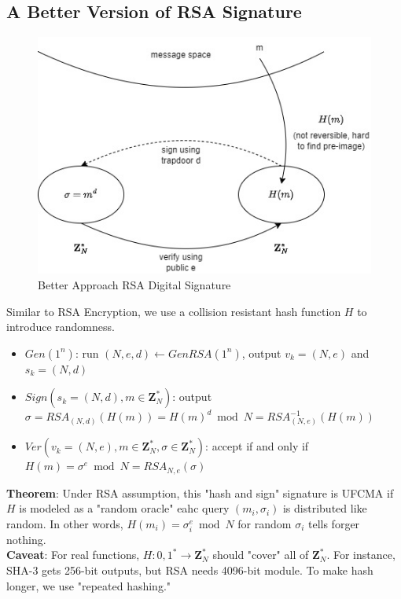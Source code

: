 \documentclass{scribe}
\begin{document}
\subsection{A Better Version of RSA Signature}
\begin{figure}[H]
    \centering
    \includegraphics[scale=0.5]{better_approach.jpg}
    \caption{Better Approach RSA Digital Signature}
\end{figure}
Similar to RSA Encryption, we use a collision resistant hash function $H$ to introduce randomness.
\begin{itemize}
    \item $Gen(1^n)$: run $(N,e,d) \leftarrow GenRSA(1^n)$, output $v_k = (N,e)$ and $s_k = (N,d)$
    \item $Sign(s_k=(N,d), m \in \mathbf{Z}_N^*)$: output $\sigma = RSA_(N,d)(H(m)) = H(m)^d \bmod N = RSA_{(N,e)}^{-1}(H(m))$
    \item $Ver(v_k=(N,e), m \in \mathbf{Z}_N^*, \sigma \in \mathbf{Z}_N^*)$: accept if and only if $H(m) = \sigma^e \bmod N  = RSA_{N,e}(\sigma)$
\end{itemize}
\textbf{Theorem}: Under RSA assumption, this "hash and sign" signature is UFCMA if $H$ is modeled as a "random oracle" eahc query $(m_i, \sigma_i)$ is distributed like random. In other words, $H(m_i) = \sigma_i^e \bmod N$ for random $\sigma_i$ tells forger nothing.
\\
\textbf{Caveat}: For real functions, $H:{0,1}^* \rightarrow \mathbf{Z}_N^*$ should "cover" all of $\mathbf{Z}_N^*$. For instance, SHA-3 gets 256-bit outputs, but RSA needs 4096-bit module. To make hash longer, we use "repeated hashing."
\vspace{10mm}




%

\end{document}

